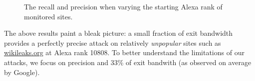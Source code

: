 \begin{figure}[t]
\centering
{}
\caption{The recall and precision when varying the starting Alexa rank of
monitored sites.}
\label{fig:wfdns:alexa}
\end{figure}

The above results paint a bleak picture: a small fraction of exit
bandwidth provides a perfectly precise attack on relatively
\emph{unpopular} sites such as \url{wikileaks.org} at Alexa rank 10808.
To better understand the limitations of our attacks, we focus on precision
and 33\% of exit bandwith (as observed on average by Google).




